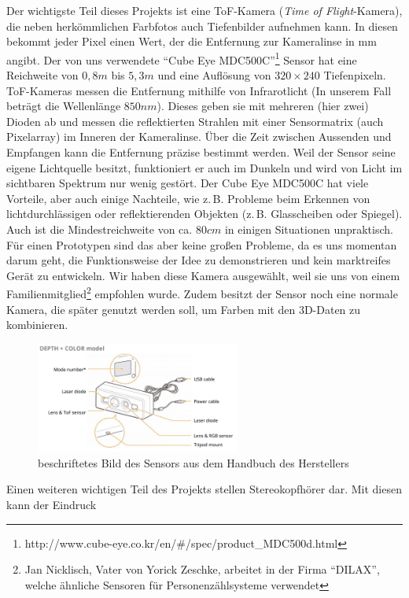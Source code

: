 \documentclass[a4paper,12pt,ngerman]{scrartcl}
\begin{document}
Der wichtigste Teil dieses Projekts ist eine ToF-Kamera (\textit{Time of Flight}-Kamera), die neben herkömmlichen Farbfotos 
auch Tiefenbilder aufnehmen kann.
In diesen bekommt jeder Pixel einen Wert, der die Entfernung zur Kameralinse in mm angibt.
Der von uns verwendete \enquote{Cube Eye MDC500C}\footnote{http://www.cube-eye.co.kr/en/\#/spec/product_MDC500d.html}
Sensor hat eine Reichweite von $0,8 m$ bis $5,3 m$ und eine Auflösung von $320 \times 240$ Tiefenpixeln. 
ToF-Kameras messen die Entfernung mithilfe von Infrarotlicht (In unserem Fall beträgt die Wellenlänge $850nm$). Dieses geben sie mit mehreren (hier zwei) Dioden
ab und messen die reflektierten Strahlen mit einer Sensormatrix (auch Pixelarray) im Inneren der Kameralinse. 
Über die Zeit zwischen Aussenden und Empfangen kann die Entfernung präzise bestimmt werden.
Weil der Sensor seine eigene Lichtquelle besitzt, funktioniert er auch im Dunkeln und wird von Licht im 
sichtbaren Spektrum nur wenig gestört. Der Cube Eye MDC500C hat viele Vorteile, aber auch einige Nachteile, wie z.\,B. 
Probleme beim Erkennen von lichtdurchlässigen oder reflektierenden Objekten (z.\,B. Glasscheiben oder Spiegel). 
Auch ist die Mindestreichweite von ca. $80 cm$ in einigen Situationen unpraktisch. Für einen Prototypen sind das aber keine großen Probleme, da es uns momentan darum geht, die Funktionsweise der Idee zu demonstrieren und kein marktreifes
Gerät zu entwickeln. Wir haben diese Kamera ausgewählt, weil sie uns von einem 
Familienmitglied\footnote{Jan Nicklisch, Vater von Yorick Zeschke, arbeitet in der Firma
\enquote{DILAX}, welche ähnliche Sensoren für Personenzählsysteme verwendet} 
empfohlen wurde. Zudem besitzt der Sensor noch eine normale Kamera, die später genutzt werden soll, um Farben mit den 
3D-Daten zu kombinieren.
\begin{figure}[H]
	\centering
	\includegraphics[width=0.6\textwidth]{cube_eye}
	\caption{beschriftetes Bild des Sensors aus dem Handbuch des Herstellers}
	\label{cube_eye_sensor}
\end{figure} \par
Einen weiteren wichtigen Teil des Projekts stellen Stereokopfhörer dar. Mit diesen kann der Eindruck
\end{document}
